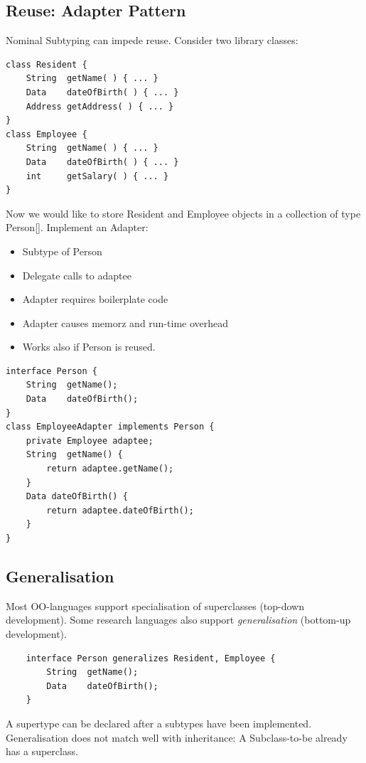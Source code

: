 \subsection{Reuse: Adapter Pattern}
Nominal Subtyping can impede reuse.  Consider two library classes:
\begin{lstlisting}
class Resident {
	String 	getName( ) { ... } 
	Data 	dateOfBirth( ) { ... }
	Address	getAddress( ) { ... } 
}
class Employee {
	String 	getName( ) { ... } 
	Data 	dateOfBirth( ) { ... } 
	int		getSalary( ) { ... }
}
\end{lstlisting}
Now we would like to store Resident and Employee objects in a collection of type Person[]. Implement an Adapter:
\begin{itemize}
	\item Subtype of Person
	\item Delegate calls to adaptee
	\item Adapter requires boilerplate code
	\item Adapter causes memorz and run-time overhead
	\item Works also if Person is reused.
\end{itemize}

\begin{lstlisting}[caption=Adapter Pattern]
interface Person { 
	String 	getName(); 
	Data 	dateOfBirth();
}
class EmployeeAdapter implements Person { 
	private	Employee adaptee;
	String	getName() {
		return adaptee.getName(); 
	} 
	Data dateOfBirth() { 
		return adaptee.dateOfBirth(); 
	}
}
\end{lstlisting}

\subsection{Generalisation}
Most OO-languages support specialisation of superclasses (top-down development). Some research languages also support \emph{generalisation} (bottom-up development).
\begin{lstlisting}
	interface Person generalizes Resident, Employee {
		String	getName();
		Data	dateOfBirth();
	}
\end{lstlisting}
A supertype can be declared after a subtypes have been implemented. 
Generalisation does not match well with inheritance: A Subclass-to-be already has a superclass.


